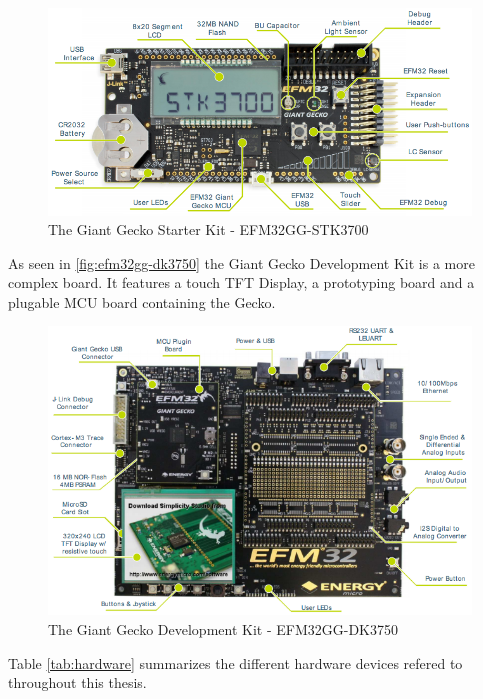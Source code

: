 \begin{figure}[H]
  \begin{center}
    \includegraphics[scale=0.4]{figures/efm32gg-stk3700}
  \end{center}
  \caption{The Giant Gecko Starter Kit - EFM32GG-STK3700 \cite{UM-STK} }
  \label{fig:efm32gg-stk3700}
\end{figure}

As seen in \autoref{fig:efm32gg-dk3750} the Giant Gecko Development Kit is a more complex board.
It features a touch TFT Display, a prototyping board and a plugable MCU board containing the Gecko.

\begin{figure}[H]
  \begin{center}
    \includegraphics[scale=0.5]{figures/efm32gg-dk3750}
  \end{center}
  \caption{The Giant Gecko Development Kit - EFM32GG-DK3750 \cite{UM-DK}}
  \label{fig:efm32gg-dk3750}
\end{figure}

Table \ref{tab:hardware} summarizes the different hardware devices refered to throughout this thesis.

